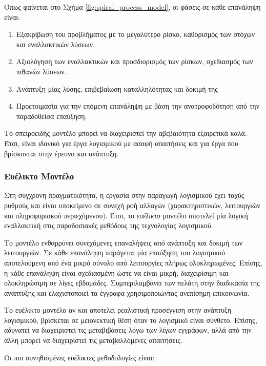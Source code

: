 \documentclass{report}
\begin{document}
Όπως φαίνεται στο Σχήμα \ref{fig:spiral_process_model}, οι φάσεις σε κάθε επανάληψη είναι:
\begin{enumerate}
    \item Εξακρίβωση του προβλήματος με το μεγαλύτερο ρίσκο, καθορισμός των στόχων και εναλλακτικών λύσεων.
    \item Αξιολόγηση των εναλλακτικών και προσδιορισμός των ρίσκων, σχεδιασμός των πιθανών λύσεων.
    \item Ανάπτυξη μίας λύσης, επιβεβαίωση καταλληλότητας και δοκιμή της
    \item Προετοιμασία για την επόμενη επανάληψη με βάση την ανατροφοδότηση από την παραδοθείσα επαύξηση.
\end{enumerate}

Το σπειροειδής μοντέλο μπορεί να διαχειριστεί την αβεβαιότητα εξαιρετικά καλά. Έτσι, είναι ιδανικό για έργα λογισμικού με ασαφή απαιτήσεις και για έργα που βρίσκονται στην έρευνα και ανάπτυξη.

\subsubsection{Ευέλικτο Μοντέλο}
Στη σύγχρονη πραγματικότητα, η εργασία στην παραγωγή λογισμικού έχει ταχύς ρυθμούς και είναι υποκείμενο σε συνεχή ροή αλλαγών (χαρακτηριστικών, λειτουργιών και πληροφοριακού περιεχόμενου). Έτσι, το \textsl{ευέλικτο} μοντέλο αποτελεί μία λογική εναλλακτική στις παραδοσιακές μεθόδους της τεχνολογίας λογισμικού. 

Το μοντέλο ενθαρρύνει συνεχόμενες επαναλήψεις από ανάπτυξη και δοκιμή των λειτουργιών. Σε κάθε επανάληψη παράγεται μία επαύξηση του λογισμικού αποτελούμενη από ένα μικρό σύνολο από λειτουργίες πλήρως ολοκληρωμένες. Επίσης, η κάθε επανάληψη είναι σχεδιασμένη ώστε να είναι μικρή, διαχειρίσιμη και ολοκληρώσιμη σε λίγες εβδομάδες. Συμπεριλαμβάνει των πελάτη στην διαδικασία της ανάπτυξης και ελαχιστοποιεί τα έγγραφα χρησιμοποιώντας ανεπίσημη επικοινωνία.

Το ευέλικτο μοντέλο αν και αποτελεί ρεαλιστική προσέγγιση στην ανάπτυξη λογισμικού, βρίσκεται σε μειονεκτική θέση όταν το λογισμικό είναι σύνθετο. Επίσης, αδυνατεί να διαχειριστεί τις μεταβιβάσεις λόγω των λίγων εγγράφων, αλλά από την άλλη μπορεί να διαχειριστεί τις μεταβαλλόμενες απαιτήσεις.

Οι πιο συνηθισμένες ευέλικτες μεθοδολογίες είναι:
\end{document}
